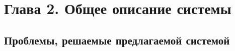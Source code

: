 \documentclass[14pt,a4paper]{extarticle}
\begin{document}


\section{Глава 2. Общее описание системы}

\subsection{Проблемы, решаемые предлагаемой системой}
\end{document}

